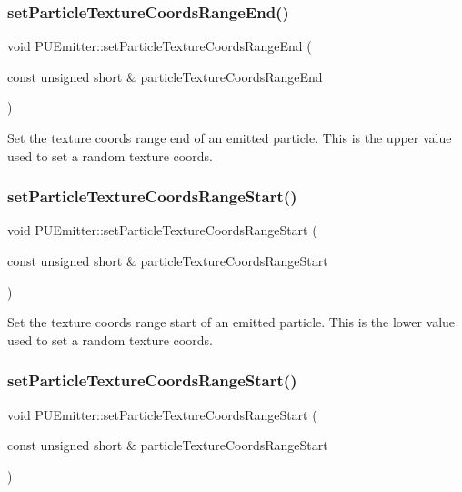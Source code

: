 \subsubsection{\texorpdfstring{set\+Particle\+Texture\+Coords\+Range\+End()}{setParticleTextureCoordsRangeEnd()}\hspace{0.1cm}{\footnotesize\ttfamily [2/2]}}
{\footnotesize\ttfamily void P\+U\+Emitter\+::set\+Particle\+Texture\+Coords\+Range\+End (\begin{DoxyParamCaption}\item[{const unsigned short \&}]{particle\+Texture\+Coords\+Range\+End }\end{DoxyParamCaption})}

Set the texture coords range end of an emitted particle. This is the upper value used to set a random texture coords. \mbox{\label{classPUEmitter_a52c268b861b30c2870665e13df528015}} 
\subsubsection{\texorpdfstring{set\+Particle\+Texture\+Coords\+Range\+Start()}{setParticleTextureCoordsRangeStart()}\hspace{0.1cm}{\footnotesize\ttfamily [1/2]}}
{\footnotesize\ttfamily void P\+U\+Emitter\+::set\+Particle\+Texture\+Coords\+Range\+Start (\begin{DoxyParamCaption}\item[{const unsigned short \&}]{particle\+Texture\+Coords\+Range\+Start }\end{DoxyParamCaption})}

Set the texture coords range start of an emitted particle. This is the lower value used to set a random texture coords. \mbox{\label{classPUEmitter_a52c268b861b30c2870665e13df528015}} 
\subsubsection{\texorpdfstring{set\+Particle\+Texture\+Coords\+Range\+Start()}{setParticleTextureCoordsRangeStart()}\hspace{0.1cm}{\footnotesize\ttfamily [2/2]}}
{\footnotesize\ttfamily void P\+U\+Emitter\+::set\+Particle\+Texture\+Coords\+Range\+Start (\begin{DoxyParamCaption}\item[{const unsigned short \&}]{particle\+Texture\+Coords\+Range\+Start }\end{DoxyParamCaption})}


